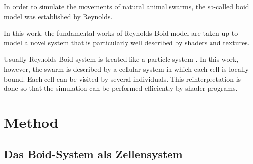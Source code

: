 \documentclass[a4paper, 10pt, journal]{wissarbIEEE}      %
\begin{document}
%
%

In order to simulate the movements of natural animal swarms, the so-called boid model was established by Reynolds. 

In this work, the fundamental works of Reynolds Boid model \cite{Reynolds87flocks} \cite{Reynolds99steeringbehaviors} are taken up to model a novel system that is particularly well described by shaders and textures. 

Usually Reynolds Boid system is treated like a particle system \cite{Reynolds87flocks} \cite{Oliver14Tschesche}. In this work, however, the swarm is described by a cellular system in which each cell is locally bound. Each cell can be visited by several individuals. This reinterpretation is done so that the simulation can be performed efficiently by shader programs.



\section{Method}
\subsection{Das Boid-System als Zellensystem}
\label{sec_noParticelCells}

\end{document}
